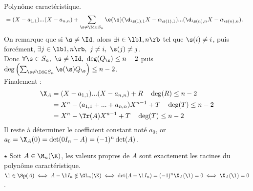 \documentclass[11pt]{article}
\begin{document}
\begin{defi}{Polynôme caractéristique.}{}
\begin{align*}
        &=(X-a_{1,1})...(X-a_{n,n}) + \sum_{\s\neq\Id\in S_n}\e(\s)(\d_{\s(1),1}X-a_{\s(1),1})...(\d_{\s(n),n}X-a_{\s(n),n}).
    \end{align*}
    On remarque que si $\s\neq\Id$, alors $\exists i \in \lb1,n\rb$ tel que $\s(i)\neq i$, puis forcément, $\exists j \in \lb1,n\rb, ~ j \neq i, ~ \s(j)\neq j$.\\
    Donc $\forall \s \in S_n, ~ \s\neq\Id, ~ \deg(Q_\s)\leq n-2$ puis $\deg\left( \sum_{\s\neq\Id\in S_n}\e(\s)Q_\s \right)\leq n-2$.\\
    Finalement :
    \begin{align*}
        \X_A &= (X-a_{1,1})...(X-a_{n,n})+R \quad \deg(R)\leq n-2\\
        &= X^n - (a_{1,1}+...+a_{n,n})X^{n-1} + T \quad \deg(T)\leq n-2\\
        &= X^n - \Tr(A)X^{n-1} + T \quad \deg(T) \leq n-2
    \end{align*}
    Il reste à déterminer le coefficient constant noté $a_0$, or $a_0=\X_A(0)=\det(0I_n-A)=(-1)^n\det(A)$.
\end{defi}

\begin{prop}{$\star$}{}
    Soit $A\in \M_n(\K)$, les valeurs propres de $A$ sont exactement les racines du polynôme caractéristique.
    \tcblower
    $\l\in\Sp(A) \iff A-\l I_n \notin \GL_n(\K) \iff \det(A-\l I_n) = (-1)^n\X_A(\l) = 0 \iff \X_A(\l) = 0$.
\end{prop}
\end{document}
